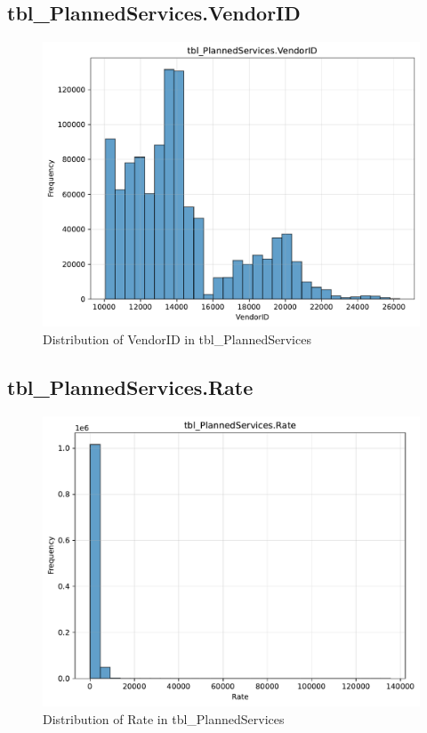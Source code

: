 \subsection{tbl\_PlannedServices.VendorID}

\begin{figure}[htbp]
\centering
\includegraphics[width=\textwidth]{figures/dbo_tbl_PlannedServices_VendorID.pdf}
\caption{Distribution of VendorID in tbl\_PlannedServices}
\end{figure}\newpage

\subsection{tbl\_PlannedServices.Rate}

\begin{figure}[htbp]
\centering
\includegraphics[width=\textwidth]{figures/dbo_tbl_PlannedServices_Rate.pdf}
\caption{Distribution of Rate in tbl\_PlannedServices}
\end{figure}\newpage

